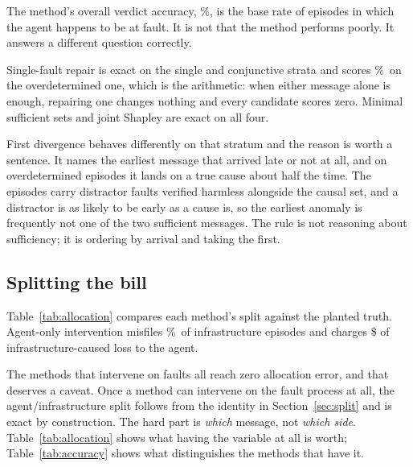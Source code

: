 \documentclass[conference]{IEEEtran}
\begin{document}
The method's overall verdict accuracy, \agentOnlyVerdict\%, is the base rate
of episodes in which the agent happens to be at fault. It is not that the
method performs poorly. It answers a different question correctly.

Single-fault repair is exact on the single and conjunctive strata and scores
\faultSingleOverdet\%\ on the overdetermined one, which is the arithmetic:
when either message alone is enough, repairing one changes nothing and every
candidate scores zero. Minimal sufficient sets and joint Shapley are exact on
all four.

First divergence behaves differently on that stratum and the reason is worth a
sentence. It names the earliest message that arrived late or not at all, and
on overdetermined episodes it lands on a true cause about half the time. The
episodes carry distractor faults verified harmless alongside the causal set,
and a distractor is as likely to be early as a cause is, so the earliest
anomaly is frequently not one of the two sufficient messages. The rule is not
reasoning about sufficiency; it is ordering by arrival and taking the first.

\subsection{Splitting the bill}

\begin{table}[t]
\centering
\caption{Allocation between agent and infrastructure. Dollars charged to the
agent are infrastructure-caused loss filed against a decision.}
\label{tab:allocation}
\footnotesize\setlength{\tabcolsep}{3pt}

\end{table}

Table~\ref{tab:allocation} compares each method's split against the planted
truth. Agent-only intervention misfiles \agentOnlyMisattr\%\ of infrastructure
episodes and charges \$\agentOnlyDollars{} of infrastructure-caused loss to the
agent.

The methods that intervene on faults all reach zero allocation error, and that
deserves a caveat. Once a method can intervene on the
fault process at all, the agent/infrastructure split follows from the identity
in Section~\ref{sec:split} and is exact by construction. The hard part is
\emph{which} message, not \emph{which side}. Table~\ref{tab:allocation} shows
what having the variable at all is worth; Table~\ref{tab:accuracy} shows what
distinguishes the methods that have it.
\end{document}

